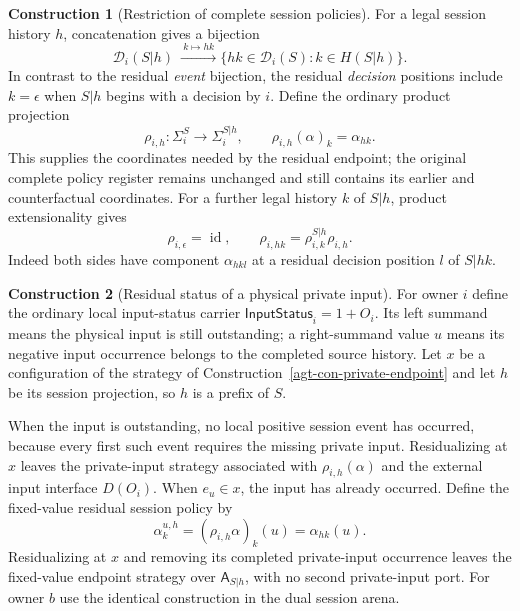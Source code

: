 \documentclass[11pt,a4paper]{article}
\numberwithin{equation}{section}
\theoremstyle{definition}
\newtheorem{construction}[construction]{Construction}
\theoremstyle{remark}
\theoremstyle{plain}
\providecommand{\id}{\mathop{\mathrm{id}}}
\begin{document}
\begin{construction}[Restriction of complete session policies]
\label{agt-con-session-policy-residual}
For a legal session history $h$, concatenation gives a bijection
\[
 \mathcal D_i(S|h)\ \xrightarrow{\ k\mapsto hk\ }
 \{hk\in\mathcal D_i(S):k\in H(S|h)\}.
\]
In contrast to the residual \emph{event} bijection, the residual
\emph{decision} positions include $k=\epsilon$ when $S|h$ begins
with a decision by $i$.  Define the ordinary product projection
\[
 \boxed{\rho_{i,h}:\Sigma_i^S\longrightarrow\Sigma_i^{S|h},
 \qquad\rho_{i,h}(\alpha)_k=\alpha_{hk}.}
\]
This supplies the coordinates needed by the residual endpoint; the
original complete policy register remains unchanged and still contains
its earlier and counterfactual coordinates.  For a further legal history
$k$ of $S|h$, product extensionality gives
\begin{equation}
 \rho_{i,\epsilon}=\id,\qquad
 \rho_{i,hk}=\rho_{i,k}^{S|h}\rho_{i,h}.
 \label{agt-eq-session-policy-residual}
\end{equation}
Indeed both sides have component $\alpha_{hkl}$ at a residual decision
position $l$ of $S|hk$.
\end{construction}

\begin{construction}[Residual status of a physical private input]
\label{agt-con-session-input-status}
For owner $i$ define the ordinary local input-status carrier
$\mathsf{InputStatus}_i=1+O_i$.  Its left summand means the physical
input is still outstanding; a right-summand value $u$ means its negative
input occurrence belongs to the completed source history.  Let $x$ be
a configuration of the strategy of
Construction~\ref{agt-con-private-endpoint} and let $h$ be its session
projection, so $h$ is a prefix of $S$.

When the input is outstanding, no local positive session event has
occurred, because every first such event requires the missing private
input.  Residualizing at $x$ leaves the private-input strategy associated
with $\rho_{i,h}(\alpha)$ and the external input interface $D(O_i)$.
When $e_u\in x$, the input has already occurred.  Define the fixed-value
residual session policy by
\[
 \alpha^{u,h}_k=(\rho_{i,h}\alpha)_k(u)=\alpha_{hk}(u).
\]
Residualizing at $x$ and removing its completed private-input occurrence
leaves the fixed-value endpoint strategy over $\mathsf A_{S|h}$, with no
second private-input port.  For owner $b$ use the identical construction
in the dual session arena.
\end{construction}
\end{document}
